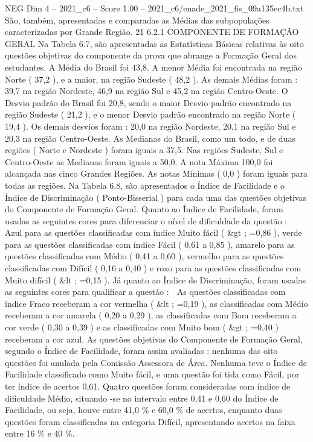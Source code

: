 \begin{textsample}{NEG Dim 4 – 2021\_c6 – Score 1.00 – 2021\_c6/enade\_2021\_fis\_09a135ec4b.txt}
São, também, apresentadas e comparadas as Médias das subpopulações caracterizadas por Grande Região. 21 6.2.1 COMPONENTE DE FORMAÇÃO GERAL Na Tabela 6.7, são apresentadas as Estatísticas Básicas relativas às oito questões objetivas do componente da prova que abrange a Formação Geral dos estudantes.
A Média do Brasil foi 43,8.
A menor Média foi encontrada na região Norte ( 37,2 ), e a maior, na região Sudeste ( 48,2 ).
As demais Médias foram : 39,7 na região Nordeste, 46,9 na região Sul e 45,2 na região Centro-Oeste.
O Desvio padrão do Brasil foi 20,8, sendo o maior Desvio padrão encontrado na região Sudeste ( 21,2 ), e o menor Desvio padrão encontrado na região Norte ( 19,4 ).
Os demais desvios foram : 20,0 na região Nordeste, 20,1 na região Sul e 20,3 na região Centro-Oeste.
As Medianas do Brasil, como um todo, e de duas regiões ( Norte e Nordeste ) foram iguais a 37,5.
Nas regiões Sudeste, Sul e Centro-Oeste as Medianas foram iguais a 50,0.
A nota Máxima 100,0 foi alcançada nas cinco Grandes Regiões.
As notas Mínimas ( 0,0 ) foram iguais para todas as regiões.
Na Tabela 6.8, são apresentados o Índice de Facilidade e o Índice de Discriminação ( Ponto-Bisserial ) para cada uma das questões objetivas do Componente de Formação Geral.
Quanto ao Índice de Facilidade, foram usadas as seguintes cores para diferenciar o nível de dificuldade da questão :  Azul para as questões classificadas com índice Muito fácil ( \&gt ; =0,86 ), verde para as questões classificadas com índice Fácil ( 0,61 a 0,85 ), amarelo para as questões classificadas com Médio ( 0,41 a 0,60 ), vermelho para as questões classificadas com Difícil ( 0,16 a 0,40 ) e roxo para as questões classificadas com Muito difícil ( \&lt ; =0,15 ).
Já quanto ao Índice de Discriminação, foram usadas as seguintes cores para qualificar a questão :  As questões classificadas com índice Fraco receberam a cor vermelha ( \&lt ; =0,19 ), as classificadas com Médio receberam a cor amarela ( 0,20 a 0,29 ), as classificadas com Bom receberam a cor verde ( 0,30 a 0,39 ) e as classificadas com Muito bom ( \&gt ; =0,40 ) receberam a cor azul.
As questões objetivas do Componente de Formação Geral, segundo o Índice de Facilidade, foram assim avaliadas : nenhuma das oito questões foi anulada pela Comissão Assessora de Área.
Nenhuma teve o Índice de Facilidade classificado como Muito fácil, e uma questão foi tida como Fácil, por ter índice de acertos 0,61.
Quatro questões foram consideradas com índice de dificuldade Médio, situando -se no intervalo entre 0,41 e 0,60 do Índice de Facilidade, ou seja, houve entre 41,0 \% e 60,0 \% de acertos, enquanto duas questões foram classificadas na categoria Difícil, apresentando acertos na faixa entre 16 \% e 40 \%.

\end{textsample}

